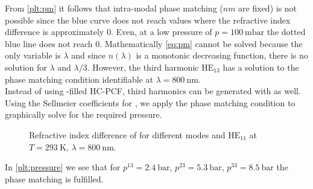 \documentclass[fleqn, 10pt, twocolumn]{SelfArx}
\begin{document}
    From \autoref{plt:pm} it follows that intra-modal phase matching ($nm$ are fixed) is not possible since the blue curve does not reach values where the refractive index difference is approximately 0.
    Even, at a low pressure of $p=\SI{100}{\milli\bar}$ the dotted blue line does not reach 0. 
    Mathematically \eqref{eq:pm} cannot be solved because the only variable is $\lambda$ and since $n(\lambda)$ is a monotonic decreasing function, there is no solution for $\lambda$ and $\lambda/3$. 
    However, the third harmonic $\text{HE}_{13}$ has a solution to the phase matching condition identifiable at $\lambda=\SI{800}{\nano\meter}$.\\
    Instead of using -filled HC-PCF, third harmonics can be generated with  as well. 
    Using the Sellmeier coefficients for , we apply the phase matching condition to 
    graphically solve for the required pressure.
    \begin{figure}[h]
        \centering
        \caption{Refractive index difference of  for different  modes and $\text{HE}_{11}$ at $T=\SI{293}{\kelvin}$,  $\lambda=\SI{800}{\nano\meter}$.}
        \label{plt:pressure}
    \end{figure}
    In \autoref{plt:pressure} we see that for $p^{13}=\SI{2.4}{\bar}$, $p^{23}=\SI{5.3}{\bar}$, $p^{33}=\SI{8.5}{\bar}$ the phase matching is fulfilled. 
\end{document}
